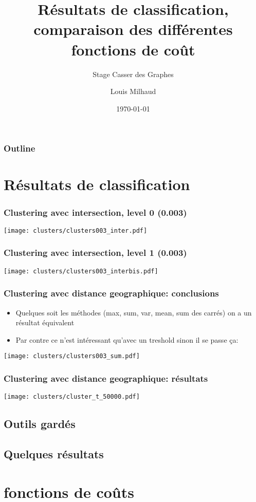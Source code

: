 \documentclass[aspectratio=169]{beamer}
\title{Résultats de classification, comparaison des différentes fonctions de coût}
\subtitle{Stage Casser des Graphes}
\author{Louis Milhaud}
\institute{Complex Networks - LIP6}
\date{\today}
\begin{document}
    \begin{frame}
        \titlepage
    \end{frame}

    \begin{frame}
        \frametitle{Outline}
        \tableofcontents
    \end{frame}

    \section{Résultats de classification}
    \begin{frame}
        \frametitle{Clustering avec intersection, level 0 (0.003)}
        \centering
        \texttt{[image: clusters/clusters003\_inter.pdf]}
    
    \end{frame}
    
    \begin{frame}
        \frametitle{Clustering avec intersection, level 1 (0.003)}
        \centering
        \texttt{[image: clusters/clusters003\_interbis.pdf]}
    \end{frame}
    
    \begin{frame}
        \frametitle{Clustering avec distance geographique: conclusions}
        \begin{itemize}
            \item Quelques soit les méthodes (max, sum, var, mean, sum des carrés) on a un résultat équivalent
            \item Par contre ce n'est intéressant qu'avec un treshold sinon il se passe ça:
        \end{itemize}
        \centering
        \texttt{[image: clusters/clusters003\_sum.pdf]}
    \end{frame}
    
    \begin{frame}
        \frametitle{Clustering avec distance geographique: résultats}
        \centering
        \texttt{[image: clusters/cluster\_t\_50000.pdf]}
    \end{frame}

    \subsection{Outils gardés}
    \subsection{Quelques résultats}
    \section{fonctions de coûts}
    
\end{document}
